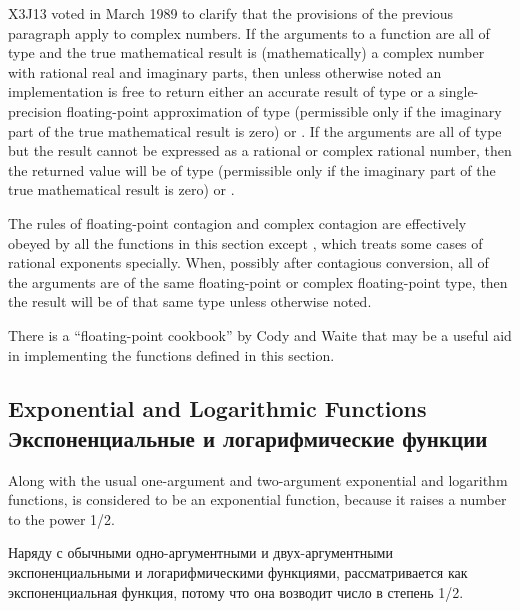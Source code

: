 \begin{newer}
X3J13 voted in March 1989
to clarify that the provisions of the previous paragraph apply to complex
numbers.  If the arguments to a function are all of type
 and the true mathematical result
is (mathematically) a complex number with rational real
and imaginary parts, then unless otherwise noted
an implementation is free to return either an accurate result of
type 
or a single-precision floating-point approximation
of type  (permissible only if the imaginary part
of the true mathematical result is zero) or .
If the arguments are all of type
 but the result cannot be expressed
as a rational or complex rational number, then the returned value
will be of type  (permissible only if the imaginary part
of the true mathematical result is zero) or .
\end{newer}

The rules of floating-point contagion and complex contagion are 
effectively obeyed by all the functions in this section except ,
which treats some cases of rational exponents specially.
When, possibly after contagious conversion, all of the arguments are of
the same floating-point or complex floating-point type,
then the result will be of that same type unless otherwise noted.

\beforenoterule
\begin{implementation}
There is a ``floating-point cookbook'' by
Cody and Waite \cite{CODY-AND-WAITE} that may be a useful aid
in implementing the functions defined in this section.
\end{implementation}
\afternoterule

\subsection{Exponential and Logarithmic Functions Экспоненциальные и логарифмические функции}

Along with the usual one-argument and two-argument exponential and
logarithm functions,  is considered to be an exponential
function, because it raises a number to the power 1/2.

Наряду с обычными одно-аргументными и двух-аргументными экспоненциальными и
логарифмическими функциями,  рассматривается как экспоненциальная
функция, потому что она возводит число в степень 1/2.

